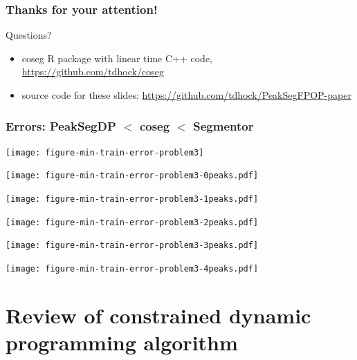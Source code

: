 \documentclass{beamer}
\begin{document}
\begin{frame}
  \frametitle{Thanks for your attention!}

  Questions? 
  \begin{itemize}
  \item 
  coseg R package with linear time C++ code,
  \url{https://github.com/tdhock/coseg}
\item   source code for these slides:
  \url{https://github.com/tdhock/PeakSegFPOP-paper}
  \end{itemize}
\end{frame}

\begin{frame}
  \frametitle{Errors: PeakSegDP $<$ coseg $<$ Segmentor}
  \texttt{[image: figure-min-train-error-problem3]}
\end{frame}

\begin{frame}
  \texttt{[image: figure-min-train-error-problem3-0peaks.pdf]}
\end{frame}

\begin{frame}
  \texttt{[image: figure-min-train-error-problem3-1peaks.pdf]}
\end{frame}

\begin{frame}
  \texttt{[image: figure-min-train-error-problem3-2peaks.pdf]}
\end{frame}

\begin{frame}
  \texttt{[image: figure-min-train-error-problem3-3peaks.pdf]}
\end{frame}

\begin{frame}
  \texttt{[image: figure-min-train-error-problem3-4peaks.pdf]}
\end{frame}

\section*{Review of constrained dynamic programming algorithm}






\end{document}
